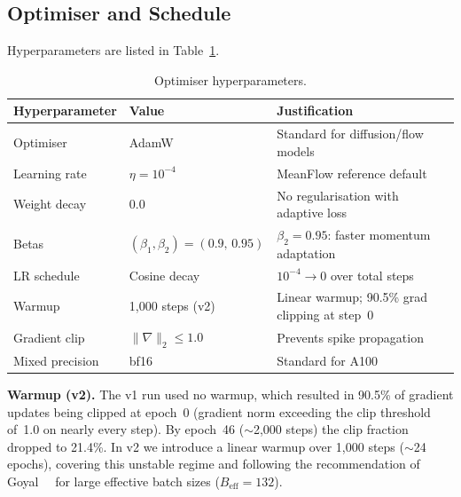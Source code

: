 \subsection{Optimiser and Schedule}

Hyperparameters are listed in Table~\ref{tab:optimiser}.

\begin{table}[ht]
\centering
\caption{Optimiser hyperparameters.}
\label{tab:optimiser}
\begin{tabular}{lll}
\toprule
\textbf{Hyperparameter} & \textbf{Value} & \textbf{Justification} \\
\midrule
Optimiser       & AdamW         & Standard for diffusion/flow models \\
Learning rate   & $\eta = 10^{-4}$     & MeanFlow reference default \\
Weight decay    & 0.0           & No regularisation with adaptive loss \\
Betas           & $(\beta_1, \beta_2) = (0.9,\,0.95)$  & $\beta_2{=}0.95$: faster momentum adaptation \\
LR schedule     & Cosine decay  & $10^{-4} \to 0$ over total steps \\
Warmup          & 1{,}000 steps (v2) & Linear warmup; 90.5\% grad clipping at step~0 \\
Gradient clip   & $\|\nabla\|_2 \le 1.0$ & Prevents spike propagation \\
Mixed precision & bf16          & Standard for A100 \\
\bottomrule
\end{tabular}
\end{table}

\textbf{Warmup (v2).}  The v1 run used no warmup, which resulted in 90.5\%
of gradient updates being clipped at epoch~0 (gradient norm exceeding the
clip threshold of~1.0 on nearly every step).  By epoch~46 (${\sim}$2{,}000
steps) the clip fraction dropped to 21.4\%.  In v2 we introduce a linear
warmup over 1{,}000 steps (${\sim}$24 epochs), covering this unstable
regime and following the recommendation of Goyal~\etal{}~\cite{goyal2017accurate}
for large effective batch sizes ($B_\mathrm{eff} = 132$).

